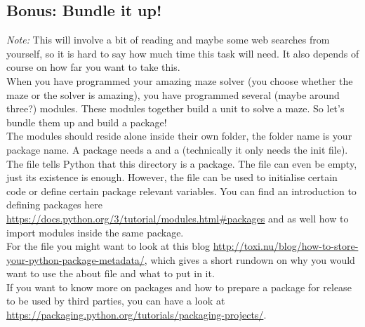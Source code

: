 \subsection{Bonus: Bundle it up!}
\emph{Note:} This will involve a bit of reading and maybe some web searches
from yourself, so it is hard to say how much time this task will need. It
also depends of course on how far you want to take this.\\[10pt]
When you have programmed your amazing maze solver (you choose whether the maze or the
solver is amazing), you have programmed several (maybe around three?) modules. These modules
together build a unit to solve a maze. So let's bundle them up and build a package!\\
The modules should reside alone inside their own folder, the folder name is your
package name. A package needs a  and a 
(technically it only needs the init file).\\
The  file tells Python that this directory is a package. 
The file can even be empty, just its existence is enough.
However, the  file can be used to initialise certain code or define
certain package relevant variables. You can find an introduction to defining packages
here \url{https://docs.python.org/3/tutorial/modules.html#packages} and as well how to
import modules inside the same package.\\
For the  file you might want to look at this blog
\url{http://toxi.nu/blog/how-to-store-your-python-package-metadata/}, which gives a short
rundown on why you would want to use the about file and what to put in it.\\[10pt]
If you want to know more on packages and how to prepare a package for release to be used
by third parties, you can have a look at \url{https://packaging.python.org/tutorials/packaging-projects/}.
